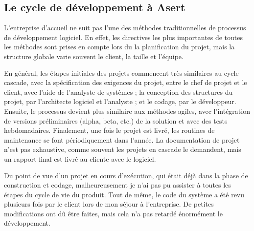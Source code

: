\subsection{Le cycle de développement à Asert}\label{cycle}

L'entreprise d'accueil ne suit pas l'une des méthodes traditionnelles de processus de développement logiciel. En effet, les directives les plus importantes de toutes les méthodes sont prises en compte lors du la planification du projet, mais la structure globale varie souvent le client, la taille et l'équipe.

En général, les étapes initiales des projets commencent très similaires au cycle cascade, avec la spécification des exigences du projet, entre le chef de projet et le client, avec l'aide de l'analyste de systèmes ; la conception des structures du projet, par l'architecte logiciel et l'analyste ; et le codage, par le développeur. Ensuite, le processus devient plus similaire aux méthodes agiles, avec l'intégration de versions préliminaires (alpha, beta, etc.) de la solution et avec des tests hebdomadaires. Finalement, une fois le projet est livré, les routines de maintenance se font périodiquement dans l'année. La documentation de projet n'est pas exhaustive, comme souvent les projets en cascade le demandent, mais un rapport final est livré au cliente avec le logiciel.

Du point de vue d'un projet en cours d'exécution, qui était déjà dans la phase de construction et codage, malheureusement je n'ai pas pu assister à toutes les étapes du cycle de vie du produit. Tout de même, le code du système a été revu plusieurs fois par le client lors de mon séjour à l'entreprise. De petites modifications ont dû être faites, mais cela n'a pas retardé énormément le développement.